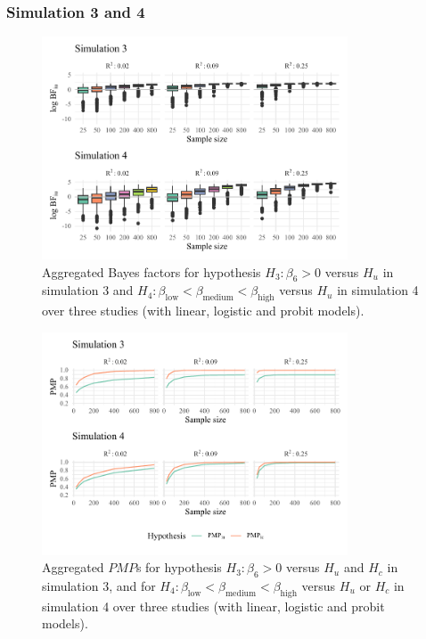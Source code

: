 \documentclass[
  authoryear,
  preprint,
  5p,
  twocolumn]{elsarticle}
\begin{document}
\hypertarget{simulation-3-and-4}{%
\subsubsection{Simulation 3 and 4}\label{simulation-3-and-4}}

\begin{figure}

{\centering \includegraphics[width=0.81\textwidth,height=\textheight]{manuscript_volker_files/figure-pdf/fig-sim34-1.pdf}

}

\caption{\label{fig-sim34-1}Aggregated Bayes factors for hypothesis
\(H_3: \beta_6 > 0\) versus \(H_u\) in simulation 3 and
\(H_4: \beta_{\text{low}} < \beta_{\text{medium}} < \beta_{\text{high}}\)
versus \(H_u\) in simulation 4 over three studies (with linear, logistic
and probit models).}

\end{figure}

\begin{figure}

{\centering \includegraphics[width=0.81\textwidth,height=\textheight]{manuscript_volker_files/figure-pdf/fig-sim34-2.pdf}

}

\caption{\label{fig-sim34-2}Aggregated \(PMP\)s for hypothesis
\(H_3: \beta_6 > 0\) versus \(H_u\) and \(H_c\) in simulation 3, and for
\(H_4: \beta_{\text{low}} < \beta_{\text{medium}} < \beta_{\text{high}}\)
versus \(H_u\) or \(H_c\) in simulation 4 over three studies (with
linear, logistic and probit models).}

\end{figure}
\end{document}
